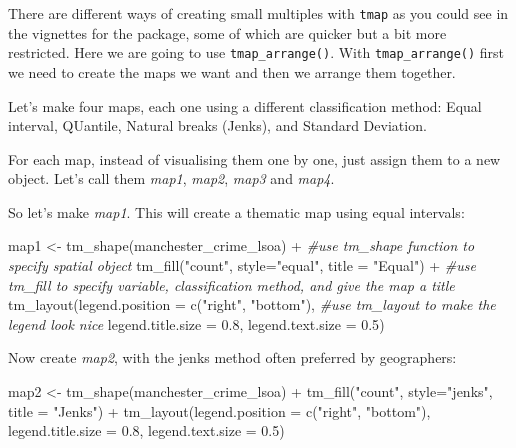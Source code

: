 \documentclass[
]{book}
\newenvironment{Shaded}{\begin{snugshade}}{\end{snugshade}}
\newcommand{\AttributeTok}[1]{\textcolor[rgb]{0.77,0.63,0.00}{#1}}
\newcommand{\CommentTok}[1]{\textcolor[rgb]{0.56,0.35,0.01}{\textit{#1}}}
\newcommand{\FloatTok}[1]{\textcolor[rgb]{0.00,0.00,0.81}{#1}}
\newcommand{\FunctionTok}[1]{\textcolor[rgb]{0.00,0.00,0.00}{#1}}
\newcommand{\NormalTok}[1]{#1}
\newcommand{\OtherTok}[1]{\textcolor[rgb]{0.56,0.35,0.01}{#1}}
\newcommand{\SpecialCharTok}[1]{\textcolor[rgb]{0.00,0.00,0.00}{#1}}
\newcommand{\StringTok}[1]{\textcolor[rgb]{0.31,0.60,0.02}{#1}}
\begin{document}
There are different ways of creating small multiples with \texttt{tmap} as you could see in the vignettes for the package, some of which are quicker but a bit more restricted. Here we are going to use \texttt{tmap\_arrange()}. With \texttt{tmap\_arrange()} first we need to create the maps we want and then we arrange them together.

Let's make four maps, each one using a different classification method: Equal interval, QUantile, Natural breaks (Jenks), and Standard Deviation.

For each map, instead of visualising them one by one, just assign them to a new object. Let's call them \emph{map1}, \emph{map2}, \emph{map3} and \emph{map4}.

So let's make \emph{map1}. This will create a thematic map using equal intervals:

\begin{Shaded}
\begin{Highlighting}[]
\NormalTok{map1 }\OtherTok{\textless{}{-}} \FunctionTok{tm\_shape}\NormalTok{(manchester\_crime\_lsoa) }\SpecialCharTok{+}                   \CommentTok{\#use tm\_shape function to specify spatial object}
  \FunctionTok{tm\_fill}\NormalTok{(}\StringTok{"count"}\NormalTok{, }\AttributeTok{style=}\StringTok{"equal"}\NormalTok{, }\AttributeTok{title =} \StringTok{"Equal"}\NormalTok{) }\SpecialCharTok{+}  \CommentTok{\#use tm\_fill to specify variable, classification method, and give the map a title}
  \FunctionTok{tm\_layout}\NormalTok{(}\AttributeTok{legend.position =} \FunctionTok{c}\NormalTok{(}\StringTok{"right"}\NormalTok{, }\StringTok{"bottom"}\NormalTok{),   }\CommentTok{\#use tm\_layout to make the legend look nice}
            \AttributeTok{legend.title.size =} \FloatTok{0.8}\NormalTok{,}
            \AttributeTok{legend.text.size =} \FloatTok{0.5}\NormalTok{)}
\end{Highlighting}
\end{Shaded}

Now create \emph{map2}, with the jenks method often preferred by geographers:

\begin{Shaded}
\begin{Highlighting}[]
\NormalTok{map2 }\OtherTok{\textless{}{-}} \FunctionTok{tm\_shape}\NormalTok{(manchester\_crime\_lsoa) }\SpecialCharTok{+} 
  \FunctionTok{tm\_fill}\NormalTok{(}\StringTok{"count"}\NormalTok{, }\AttributeTok{style=}\StringTok{"jenks"}\NormalTok{, }\AttributeTok{title =} \StringTok{"Jenks"}\NormalTok{) }\SpecialCharTok{+}
  \FunctionTok{tm\_layout}\NormalTok{(}\AttributeTok{legend.position =} \FunctionTok{c}\NormalTok{(}\StringTok{"right"}\NormalTok{, }\StringTok{"bottom"}\NormalTok{), }
            \AttributeTok{legend.title.size =} \FloatTok{0.8}\NormalTok{,}
            \AttributeTok{legend.text.size =} \FloatTok{0.5}\NormalTok{)}
\end{Highlighting}
\end{Shaded}
\end{document}
